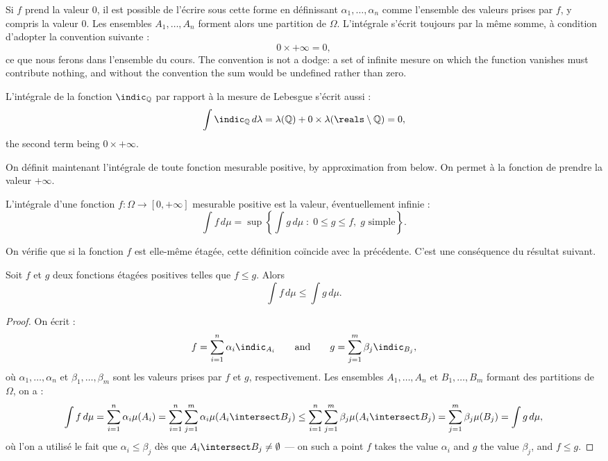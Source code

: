 Si $f$ prend la valeur $0$, il est possible de l'écrire sous cette forme en
définissant $\alpha_{1},\ldots,\alpha_{n}$ comme l'ensemble des valeurs prises par
$f$, y compris la valeur $0$. Les ensembles $A_{1},\ldots,A_{n}$ forment alors une
partition de $\Omega$. L'intégrale s'écrit toujours par la même somme, à condition
d'adopter la convention suivante :
\[
  0 \times +\infty = 0 ,
\]
ce que nous ferons dans l'ensemble du cours. The convention is not a dodge: a set of
infinite mesure on which the function vanishes must contribute nothing, and without
the convention the sum would be undefined rather than zero.

\begin{example}
  L'intégrale de la fonction $\indic_{\mathbb{Q}}$ par rapport à la mesure de
  Lebesgue s'écrit aussi :
  \[
    \int \indic_{\mathbb{Q}} \, d\lambda
    = \lambda(\mathbb{Q}) + 0 \times \lambda(\reals \setminus \mathbb{Q}) = 0 ,
  \]
  the second term being $0 \times +\infty$.
\end{example}

On définit maintenant l'intégrale de toute fonction mesurable positive, by
approximation from below. On permet à la fonction de prendre la valeur $+\infty$.

\begin{definition}
  L'intégrale d'une fonction $f : \Omega \to [0,+\infty]$ mesurable positive est la
  valeur, éventuellement infinie :
  \[
    \int f \, d\mu = \sup \left\{ \int g \, d\mu \; : \;
      0 \leq g \leq f, \; g \text{ simple} \right\} .
  \]
\end{definition}

On vérifie que si la fonction $f$ est elle-même étagée, cette définition coïncide
avec la précédente. C'est une conséquence du résultat suivant.

\begin{prop}
  Soit $f$ et $g$ deux fonctions étagées positives telles que $f \leq g$. Alors
  \[
    \int f \, d\mu \leq \int g \, d\mu .
  \]
\end{prop}

\begin{proof}
  On écrit :
  \[
    f = \sum_{i=1}^{n} \alpha_{i} \indic_{A_{i}}
    \qquad \text{and} \qquad
    g = \sum_{j=1}^{m} \beta_{j} \indic_{B_{j}},
  \]
  où $\alpha_{1},\ldots,\alpha_{n}$ et $\beta_{1},\ldots,\beta_{m}$ sont les
  valeurs prises par $f$ et $g$, respectivement. Les ensembles $A_{1},\ldots,A_{n}$
  et $B_{1},\ldots,B_{m}$ formant des partitions de $\Omega$, on a :
  \[
    \int f \, d\mu = \sum_{i=1}^{n} \alpha_{i} \mu(A_{i})
    = \sum_{i=1}^{n} \sum_{j=1}^{m} \alpha_{i} \mu(A_{i} \intersect B_{j})
    \leq \sum_{i=1}^{n} \sum_{j=1}^{m} \beta_{j} \mu(A_{i} \intersect B_{j})
    = \sum_{j=1}^{m} \beta_{j} \mu(B_{j}) = \int g \, d\mu ,
  \]
  où l'on a utilisé le fait que $\alpha_{i} \leq \beta_{j}$ dès que $A_{i} \intersect
  B_{j} \neq \emptyset$ --- on such a point $f$ takes the value $\alpha_{i}$ and $g$
  the value $\beta_{j}$, and $f \leq g$.
\end{proof}

